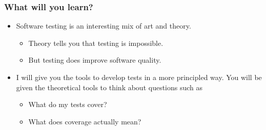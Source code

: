 \documentclass{beamer}
\begin{document}
\begin{frame}
  \frametitle{What will you learn?}
  \begin{itemize}
  \item Software testing is an interesting mix of art and theory.
    \begin{itemize}
    \item Theory tells you that testing is impossible.
    \item But testing does improve software quality.
    \end{itemize}
  \item I will give you the tools to develop tests in a more
    principled way. You will be given the theoretical tools to think
    about questions such as
    \begin{itemize}
    \item What do my tests cover?
    \item What does coverage actually mean? 
    \end{itemize}
  \end{itemize}
\end{frame}
\end{document}
